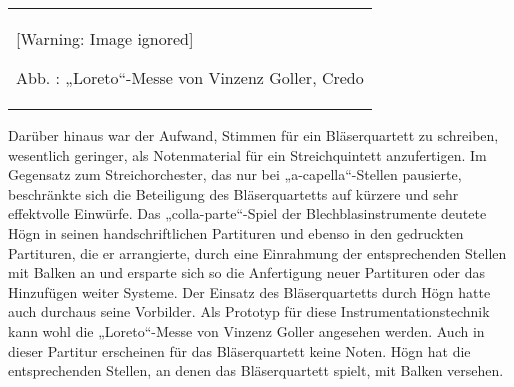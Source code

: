 \documentclass[a4paper]{article}
\newcounter{Abb}
\renewcommand\theAbb{\arabic{Abb}}
\begin{document}
\begin{flushleft}
\tablefirsthead{}
\tablehead{}
\tabletail{}
\tablelasttail{}
\begin{supertabular}{m{6.019cm}}

\begin{center}
 [Warning: Image ignored] %

\end{center}
Abb. \stepcounter{Abb}{\theAbb}: „Loreto“-Messe von Vinzenz Goller,
Credo\\
\end{supertabular}
\end{flushleft}
Darüber hinaus war der Aufwand, Stimmen für ein Bläserquartett zu
schreiben, wesentlich geringer, als Notenmaterial für ein
Streichquintett anzufertigen. Im Gegensatz zum Streichorchester, das
nur bei „a-capella“-Stellen pausierte, beschränkte sich die Beteiligung
des Bläserquartetts auf kürzere und sehr effektvolle Einwürfe. Das
„colla-parte“-Spiel der Blechblasinstrumente deutete Högn in seinen
handschriftlichen Partituren und ebenso in den gedruckten Partituren,
die er arrangierte, durch eine Einrahmung der entsprechenden Stellen
mit Balken an und ersparte sich so die Anfertigung neuer Partituren
oder das Hinzufügen weiter Systeme. Der Einsatz des Bläserquartetts
durch Högn hatte auch durchaus seine Vorbilder. Als Prototyp für diese
Instrumentationstechnik kann wohl die „Loreto“-Messe von Vinzenz Goller
angesehen werden. Auch in dieser Partitur erscheinen für das
Bläserquartett keine Noten. Högn hat die entsprechenden Stellen, an
denen das Bläserquartett spielt, mit Balken versehen.
\end{document}
